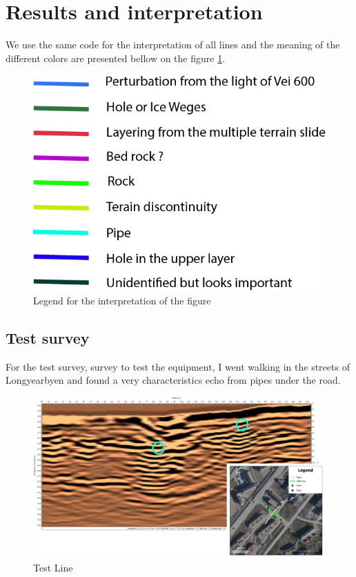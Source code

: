 \newpage
\section{Results and interpretation} \label{section:result}

We use the same code for the interpretation of all lines and the meaning of the different colors are presented bellow on the figure \ref{fig:legend}.

\begin{figure}[H]
    \centering
    \includegraphics[width=0.5\linewidth]{Images/00_Results/Legend.jpg}
    \caption{Legend for the interpretation of the figure }
    \label{fig:legend}
\end{figure}


\subsection{Test survey}

For the test survey, survey to test the equipment, I went walking in the streets of Longyearbyen and found a very characteristics echo from pipes under the road.

\begin{figure}[H]
    \centering
    \includegraphics[width=\linewidth]{Images/00_Results/Test_line_edited.jpg}
    \caption{Test Line}
    \label{fig:testLine}
\end{figure}

